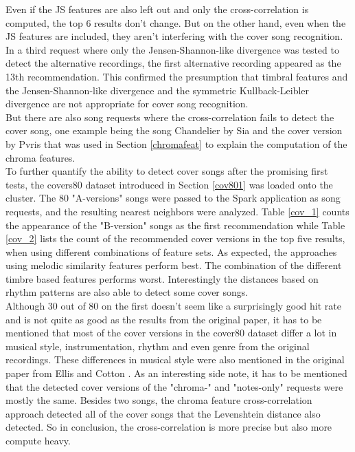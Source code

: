 \noindent Even if the JS features are also left out and only the cross-correlation is computed, the top 6 results don't change. But on the other hand, even when the JS features are included, they aren't interfering with the cover song recognition. In a third request where only the Jensen-Shannon-like divergence was tested to detect the alternative recordings, the first alternative recording appeared as the 13th recommendation. This confirmed the presumption that timbral features and the Jensen-Shannon-like divergence and the symmetric Kullback-Leibler divergence are not appropriate for cover song recognition.\\
\noindent But there are also song requests where the cross-correlation fails to detect the cover song, one example being the song Chandelier by Sia and the cover version by Pvris that was used in Section \ref{chromafeat} to explain the computation of the chroma features.\\
\noindent To further quantify the ability to detect cover songs after the promising first tests, the covers80 dataset introduced in Section \ref{cov801} was loaded onto the cluster. The 80 "A-versions" songs were passed to the Spark application as song requests, and the resulting nearest neighbors were analyzed. Table \ref{cov_1} counts the appearance of the "B-version" songs as the first recommendation while Table \ref{cov_2} lists the count of the recommended cover versions in the top five results, when using different combinations of feature sets. As expected, the approaches using melodic similarity features perform best. The combination of the different timbre based features performs worst. Interestingly the distances based on rhythm patterns are also able to detect some cover songs.\\
\noindent Although 30 out of 80 on the first doesn't seem like a surprisingly good hit rate and is not quite as good as the results from the original paper, it has to be mentioned that most of the cover versions in the cover80 dataset differ a lot in musical style, instrumentation, rhythm and even genre from the original recordings. These differences in musical style were also mentioned in the original paper from Ellis and Cotton \cite[p. 3]{cover802}.
\noindent As an interesting side note, it has to be mentioned that the detected cover versions of the "chroma-" and "notes-only" requests were mostly the same. Besides two songs, the chroma feature cross-correlation approach detected all of the cover songs that the Levenshtein distance also detected. So in conclusion, the cross-correlation is more precise but also more compute heavy.

